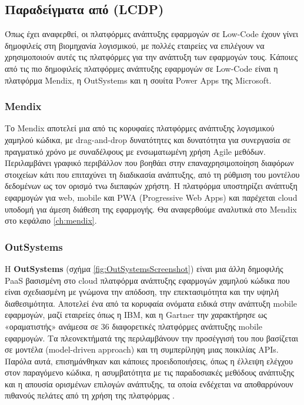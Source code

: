         \subsection{Παραδείγματα από (LCDP)}
            Όπως έχει αναφερθεί, οι πλατφόρμες ανάπτυξης εφαρμογών σε Low-Code έχουν γίνει δημοφιλείς στη βιομηχανία λογισμικού, με πολλές εταιρείες να επιλέγουν να χρησιμοποιούν αυτές τις πλατφόρμες για την ανάπτυξη των εφαρμογών τους. Κάποιες από τις πιο δημοφιλείς πλατφόρμες ανάπτυξης εφαρμογών σε Low-Code είναι η πλατφόρμα Mendix, η OutSystems και η σουίτα Power Apps της Microsoft.

            \subsubsection{Mendix}
            Το Mendix αποτελεί μια από τις κορυφαίες πλατφόρμες ανάπτυξης λογισμικού χαμηλού κώδικα, με drag-and-drop δυνατότητες και δυνατότητα για συνεργασία σε πραγματικό χρόνο με συναδέλφους με ενσωματωμένη χρήση Agile μεθόδων. Περιλαμβάνει γραφικό περιβάλλον που βοηθάει στην επαναχρησιμοποίηση διαφόρων στοιχείων κάτι που επιταχύνει τη διαδικασία ανάπτυξης, από τη ρύθμιση του μοντέλου δεδομένων ως τον ορισμό τνω διεπαφών χρήστη. Η πλατφόρμα υποστηρίζει ανάπτυξη εφαρμογών για web, mobile και PWA (Progressive Web Apps) και παρέχεται cloud υποδομή για άμεση διάθεση της εφαρμογής. Θα αναφερθούμε αναλυτικά στο Mendix στο κεφάλαιο \ref{ch:mendix}.

            \subsubsection{OutSystems}
            Η \textbf{OutSystems} (σχήμα \ref{fig:OutSystemsScreenshot}) είναι μια άλλη δημοφιλής PaaS βασισμένη στο cloud πλατφόρμα ανάπτυξης εφαρμογών χαμηλού κώδικα που είναι σχεδιασμένη με γνώμονα την απόδοση, την επεκτασιμότητα και την υψηλή διαθεσιμότητα. Αποτελεί ένα από τα κορυφαία ονόματα ειδικά στην ανάπτυξη mobile εφαρμογών, μαζί εταιρείες όπως η IBM, και η Gartner την χαρακτήρησε ως «οραματιστής» ανάμεσα σε 36 διαφορετικές πλατφόρμες ανάπτυξης mobile εφαρμογών. Τα πλεονεκτήματά της περιλαμβάνουν την προσέγγισή του που βασίζεται σε μοντέλα (model-driven approach) και τη συμπερίληψη μιας ποικιλίας APIs. Παρόλα αυτά, επισημάνθηκαν και κάποιες προειδοποιήσεις, όπως η έλλειψη ελέγχου στον παραγόμενο κώδικα, η ασυμβατότητα με τις παραδοσιακές μεθόδους ανάπτυξης και η απουσία ορισμένων επιλογών ανάπτυξης, τα οποία ενδέχεται να αποθαρρύνουν πιθανούς πελάτες από τη χρήση της πλατφόρμας \cite{QuadrantOutSystems}.

